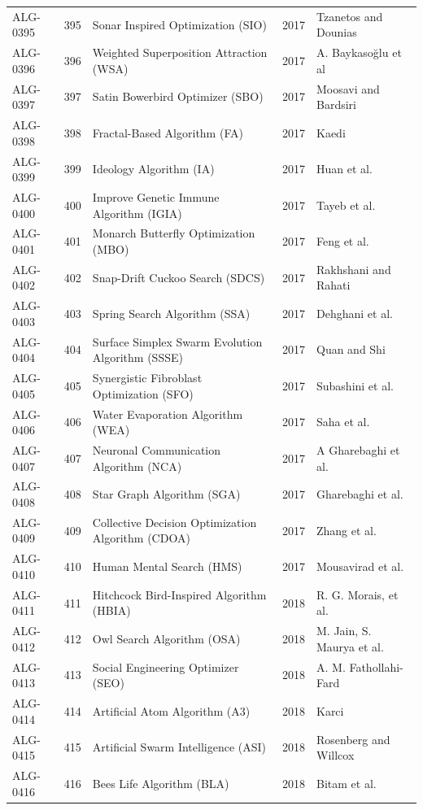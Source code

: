 \documentclass[8pt]{article}
\begin{document}
\begin{landscape}
\begin{longtable}{P{1.7cm}rP{10.0cm}rP{7.2cm}}
ALG-0395 & 395 & Sonar Inspired Optimization (SIO) & 2017 & Tzanetos and Dounias \\
ALG-0396 & 396 & Weighted Superposition Attraction (WSA) & 2017 & A. Baykasoğlu et al \\
ALG-0397 & 397 & Satin Bowerbird Optimizer (SBO) & 2017 & Moosavi and Bardsiri \\
ALG-0398 & 398 & Fractal-Based Algorithm (FA) & 2017 & Kaedi \\
ALG-0399 & 399 & Ideology Algorithm (IA) & 2017 & Huan et al. \\
ALG-0400 & 400 & Improve Genetic Immune Algorithm (IGIA) & 2017 & Tayeb et al. \\
ALG-0401 & 401 & Monarch Butterfly Optimization (MBO) & 2017 & Feng et al. \\
ALG-0402 & 402 & Snap-Drift Cuckoo Search (SDCS) & 2017 & Rakhshani and Rahati \\
ALG-0403 & 403 & Spring Search Algorithm (SSA) & 2017 & Dehghani et al. \\
ALG-0404 & 404 & Surface Simplex Swarm Evolution Algorithm (SSSE) & 2017 & Quan and Shi \\
ALG-0405 & 405 & Synergistic Fibroblast Optimization (SFO) & 2017 & Subashini et al. \\
ALG-0406 & 406 & Water Evaporation Algorithm (WEA) & 2017 & Saha et al. \\
ALG-0407 & 407 & Neuronal Communication Algorithm (NCA) & 2017 & A Gharebaghi et al. \\
ALG-0408 & 408 & Star Graph Algorithm (SGA) & 2017 & Gharebaghi et al. \\
ALG-0409 & 409 & Collective Decision Optimization Algorithm (CDOA) & 2017 & Zhang et al. \\
ALG-0410 & 410 & Human Mental Search (HMS) & 2017 & Mousavirad et al. \\
ALG-0411 & 411 & Hitchcock Bird-Inspired Algorithm (HBIA) & 2018 & R. G. Morais, et al. \\
ALG-0412 & 412 & Owl Search Algorithm (OSA) & 2018 & M. Jain, S. Maurya et al. \\
ALG-0413 & 413 & Social Engineering Optimizer (SEO) & 2018 & A. M. Fathollahi-Fard \\
ALG-0414 & 414 & Artificial Atom Algorithm (A3) & 2018 & Karci \\
ALG-0415 & 415 & Artificial Swarm Intelligence (ASI) & 2018 & Rosenberg and Willcox \\
ALG-0416 & 416 & Bees Life Algorithm (BLA) & 2018 & Bitam et al. \\

\end{longtable}
\end{landscape}
\end{document}
